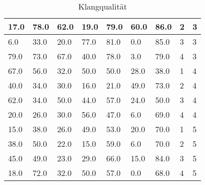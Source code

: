 \begin{table}[!ht]
{\begin{tabular}{|l|l|l|l|l|l|l|l|l|}
17.0                          & 78.0               & 62.0                   & 19.0                        & 79.0           & 60.0             & 86.0                   & 2              & 3                    \\ \hline
6.0                           & 33.0               & 20.0                   & 77.0                        & 81.0           & 0.0              & 85.0                   & 3              & 3                    \\ \hline
79.0                          & 73.0               & 67.0                   & 40.0                        & 78.0           & 3.0              & 79.0                   & 4              & 3                    \\ \hline
67.0                          & 56.0               & 32.0                   & 50.0                        & 50.0           & 28.0             & 38.0                   & 1              & 4                    \\ \hline
40.0                          & 34.0               & 30.0                   & 16.0                        & 21.0           & 49.0             & 73.0                   & 2              & 4                    \\ \hline
62.0                          & 34.0               & 50.0                   & 44.0                        & 57.0           & 24.0             & 50.0                   & 3              & 4                    \\ \hline
20.0                          & 26.0               & 30.0                   & 56.0                        & 47.0           & 6.0              & 69.0                   & 4              & 4                    \\ \hline
15.0                          & 38.0               & 26.0                   & 49.0                        & 53.0           & 20.0             & 70.0                   & 1              & 5                    \\ \hline
38.0                          & 50.0               & 22.0                   & 15.0                        & 59.0           & 6.0              & 70.0                   & 2              & 5                    \\ \hline
45.0                          & 49.0               & 23.0                   & 29.0                        & 66.0           & 15.0             & 84.0                   & 3              & 5                    \\ \hline
18.0                          & 72.0               & 32.0                   & 50.0                        & 57.0           & 0.0              & 68.0                   & 4              & 5                    \\ \hline
\end{tabular}%
}
\caption {Klangqualität}
\end{table}